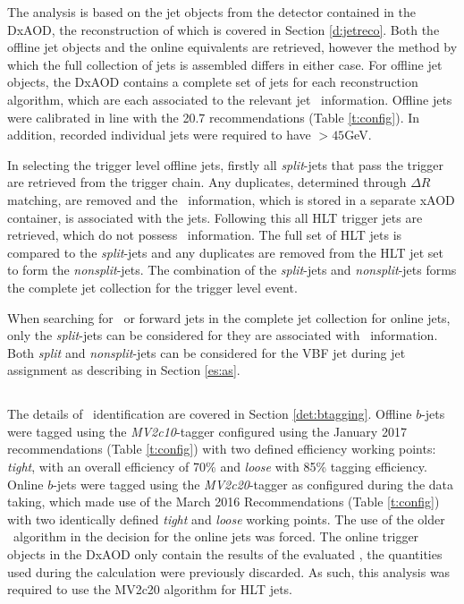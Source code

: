 		The analysis is based on the jet objects from the detector contained in the DxAOD, the reconstruction of which is covered in Section \ref{d:jetreco}. Both the offline jet objects and the online equivalents are retrieved, however the method by which the full collection of jets is assembled differs in either case. For offline jet objects, the DxAOD contains a complete set of jets for each reconstruction algorithm, which are each associated to the relevant jet \btag\, information. Offline jets were calibrated in line with the 20.7 recommendations (Table \ref{t:config}). In addition, recorded individual jets were required to have \pt$>45$GeV.

		In selecting the trigger level offline jets, firstly all \textit{split}-jets that pass the trigger are retrieved from the trigger chain. Any duplicates, determined through $\Delta R$ matching, are removed and the \btag\, information, which is stored in a separate xAOD container, is associated with the jets. Following this all HLT trigger jets are retrieved, which do not possess \btag\, information. The full set of HLT jets is compared to the \textit{split}-jets and any duplicates are removed from the HLT jet set to form the \textit{nonsplit}-jets. The combination of the \textit{split}-jets and \textit{nonsplit}-jets forms the complete jet collection for the trigger level event.

		When searching for \bjets\, or forward jets in the complete jet collection for online jets, only the \textit{split}-jets can be considered for \bjetsas they are associated with \btag\ information. Both \textit{split} and \textit{nonsplit}-jets can be considered for the VBF jet during jet assignment as describing in Section \ref{es:as}.

		\subsection{\bjets}

		The details of \bjet\ identification are covered in Section \ref{det:btagging}. Offline $b$-jets were tagged using the \textit{MV2c10}-tagger configured using the January 2017 recommendations (Table \ref{t:config}) with two defined efficiency working points: \textit{tight}, with an overall efficiency of 70\% and \textit{loose} with 85\% tagging efficiency. Online $b$-jets were tagged using the \textit{MV2c20}-tagger as configured during the data taking, which made use of the March 2016 Recommendations (Table \ref{t:config}) with two identically defined \textit{tight} and \textit{loose} working points. The use of the older \btagging\ algorithm in the decision for the online jets was forced. The online trigger objects in the DxAOD only contain the results of the evaluated \btag, the quantities used during the calculation were previously discarded. As such, this analysis was required to use the MV2c20 algorithm for HLT jets.


